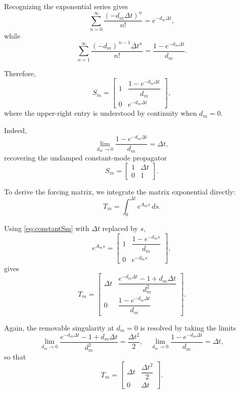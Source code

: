 \documentclass{Configuration_Files/PoliMi3i_thesis}
\begin{document}
Recognizing the exponential series gives
\begin{equation*}
\sum_{n=0}^{\infty}
\frac{(-d_m\Delta t)^n}{n!}
=
e^{-d_m\Delta t},
\end{equation*}
while
\begin{equation*}
\sum_{n=1}^{\infty}
\frac{(-d_m)^{\,n-1}\Delta t^n}{n!}
=
\frac{1-e^{-d_m\Delta t}}{d_m}.
\end{equation*}

Therefore,
\begin{equation}
S_m
=
\begin{bmatrix}
1 &
\dfrac{1-e^{-d_m\Delta t}}{d_m}
\\[3ex]
0 &
e^{-d_m\Delta t}
\end{bmatrix},
\label{eq:constantSm}
\end{equation}
where the upper-right entry is understood by continuity when \(d_m=0\).

Indeed,
\begin{equation*}
\lim_{d_m\to0}
\frac{1-e^{-d_m\Delta t}}{d_m}
=
\Delta t,
\end{equation*}
recovering the undamped constant-mode propagator
\[
S_m=
\begin{bmatrix}
1 & \Delta t\\
0 & 1
\end{bmatrix}.
\]

To derive the forcing matrix, we integrate the matrix exponential directly:
\begin{equation*}
T_m
=
\int_0^{\Delta t}
e^{A_ms}\,ds.
\end{equation*}

Using \eqref{eq:constantSm} with \(\Delta t\) replaced by \(s\),
\begin{equation*}
e^{A_ms}
=
\begin{bmatrix}
1 &
\dfrac{1-e^{-d_ms}}{d_m}
\\[3ex]
0 &
e^{-d_ms}
\end{bmatrix},
\end{equation*}
gives
\begin{equation*}
T_m
=
\begin{bmatrix}
\Delta t &
\dfrac{e^{-d_m\Delta t}-1+d_m\Delta t}{d_m^2}
\\[3ex]
0 &
\dfrac{1-e^{-d_m\Delta t}}{d_m}
\end{bmatrix}.
\end{equation*}

Again, the removable singularity at \(d_m=0\) is resolved by taking the limits
\begin{equation*}
\lim_{d_m\to0}
\frac{e^{-d_m\Delta t}-1+d_m\Delta t}{d_m^2}
=
\frac{\Delta t^2}{2}, \quad \lim_{d_m\to0}
\dfrac{1-e^{-d_m\Delta t}}{d_m}
=
\Delta t,
\end{equation*}
so that
\[
T_m=
\begin{bmatrix}
\Delta t &
\dfrac{\Delta t^2}{2}
\\
0 &
\Delta t
\end{bmatrix}.
\]
\end{document}
